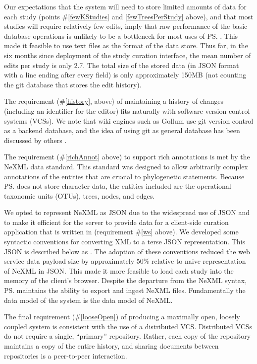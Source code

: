Our expectations that the system will need to store limited amounts of data for each study 
    (points \#\ref{fewKStudies} and \ref{fewTreesPerStudy} above), and that most
    studies will require relatively few edits, imply that
    raw performance of the basic database operations is unlikely to be a bottleneck for most
    uses of \ps.
This made it feasible to use text files as the format of the data store.
Thus far, in the six months since deployment of the study curation interface, the mean number of edits 
    per study is only 2.7.
The total size of the stored data (in JSON format with a line ending after 
    every field) is only approximately 150MB (not counting the git database that stores the edit history).

The requirement (\#\ref{history}, above) of maintaining a history of changes 
    (including an identifier for the editor) fits naturally with software version control systems (VCSs).
We note that wiki engines such as Gollum use git version control as a backend database,
and the idea of using git as general database has been discussed by others \citep[{\em e.g.}~][]{git-nosql-db}.

The requirement (\#\ref{richAnnot} above) to support rich annotations
    is met by the NeXML data standard.
    This standard was designed
    to allow arbitrarily complex annotations of the entities that are crucial to phylogenetic statements.
Because \ps does not store character data, the entities included are the operational taxonomic units (OTUs), trees, nodes, and edges.

We opted to represent NeXML as JSON
    due to the widespread use of JSON and 
    to make it efficient for the server to provide data for a client-side
    curation application that is written in \js (requirement \#\ref{ws} above).
We developed some syntactic conventions for converting XML to a terse JSON representation.
This JSON is described below as \nexson.
The adoption of these conventions reduced the web service data payload size by approximately 50\% relative to 
    naive representation of NeXML in JSON.
This made it more feasible to load each study into the memory of the client's browser.
Despite the departure from the NeXML syntax, \ps maintains the ability to export and ingest NeXML files.
Fundamentally the data model of the system is the data model of NeXML.

The final requirement (\#\ref{looseOpen}) of producing a maximally open,
    loosely coupled system is consistent with the use of a distributed
    VCS.
Distributed VCSs do not require a single, ``primary'' repository.
Rather, each copy of the repository maintains a copy of the entire history, and sharing documents between
    repositories is a peer-to-peer interaction.

